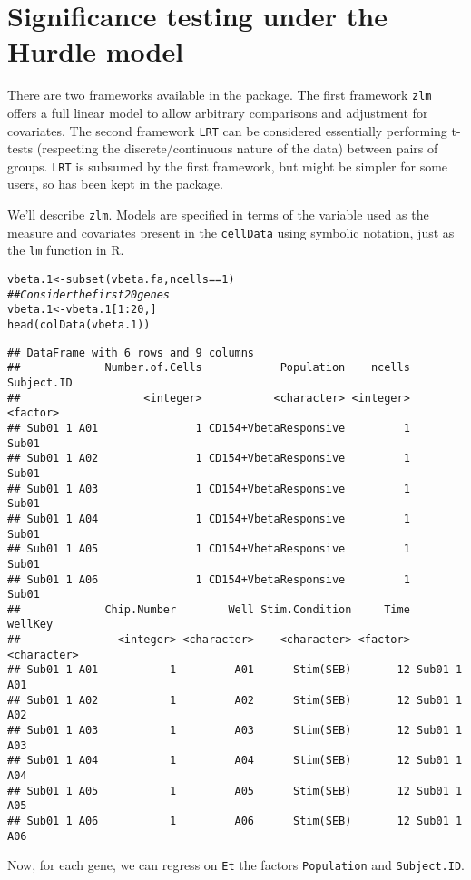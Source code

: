 \documentclass{article}\usepackage[]{graphicx}\usepackage[usenames,dvipsnames]{color}
\newcommand{\hlnum}[1]{\textcolor[rgb]{0.816,0.125,0.439}{#1}}%
\newcommand{\hlcom}[1]{\textcolor[rgb]{0.502,0.502,0.502}{\textit{#1}}}%
\newcommand{\hlopt}[1]{\textcolor[rgb]{0,0,0}{#1}}%
\newcommand{\hlstd}[1]{\textcolor[rgb]{0.251,0.251,0.251}{#1}}%
\newcommand{\hlkwb}[1]{\textcolor[rgb]{0,0,0}{#1}}%
\newcommand{\hlkwd}[1]{\textcolor[rgb]{0.878,0.439,0.125}{#1}}%
\newenvironment{knitrout}{}{} %
\begin{document}
\section{Significance testing under the Hurdle model}
There are two frameworks available in the package.  The first framework \texttt{zlm} offers a full linear model to allow arbitrary comparisons and adjustment for covariates. The second framework \texttt{LRT} can be considered essentially performing t-tests (respecting the discrete/continuous nature of the data) between pairs of groups.  \texttt{LRT} is subsumed by the first framework, but might be simpler for some users, so has been kept in the package.

We'll describe \texttt{zlm}.  Models are specified in terms of the variable used as the measure and covariates present in the \texttt{cellData} using symbolic notation, just as the \texttt{lm} function in R.
\begin{knitrout}
\color{fgcolor}\begin{kframe}
\begin{alltt}
\hlstd{vbeta.1} \hlkwb{<-} \hlkwd{subset}\hlstd{(vbeta.fa, ncells}\hlopt{==}\hlnum{1}\hlstd{)}
\hlcom{## Consider the first 20 genes}
\hlstd{vbeta.1} \hlkwb{<-} \hlstd{vbeta.1[}\hlnum{1}\hlopt{:}\hlnum{20}\hlstd{,]}
\hlkwd{head}\hlstd{(}\hlkwd{colData}\hlstd{(vbeta.1))}
\end{alltt}
\begin{verbatim}
## DataFrame with 6 rows and 9 columns
##             Number.of.Cells            Population    ncells Subject.ID
##                   <integer>           <character> <integer>   <factor>
## Sub01 1 A01               1 CD154+VbetaResponsive         1      Sub01
## Sub01 1 A02               1 CD154+VbetaResponsive         1      Sub01
## Sub01 1 A03               1 CD154+VbetaResponsive         1      Sub01
## Sub01 1 A04               1 CD154+VbetaResponsive         1      Sub01
## Sub01 1 A05               1 CD154+VbetaResponsive         1      Sub01
## Sub01 1 A06               1 CD154+VbetaResponsive         1      Sub01
##             Chip.Number        Well Stim.Condition     Time     wellKey
##               <integer> <character>    <character> <factor> <character>
## Sub01 1 A01           1         A01      Stim(SEB)       12 Sub01 1 A01
## Sub01 1 A02           1         A02      Stim(SEB)       12 Sub01 1 A02
## Sub01 1 A03           1         A03      Stim(SEB)       12 Sub01 1 A03
## Sub01 1 A04           1         A04      Stim(SEB)       12 Sub01 1 A04
## Sub01 1 A05           1         A05      Stim(SEB)       12 Sub01 1 A05
## Sub01 1 A06           1         A06      Stim(SEB)       12 Sub01 1 A06
\end{verbatim}
\end{kframe}
\end{knitrout}
Now, for each gene, we can regress on \texttt{Et} the factors \texttt{Population} and \texttt{Subject.ID}.
\end{document}
